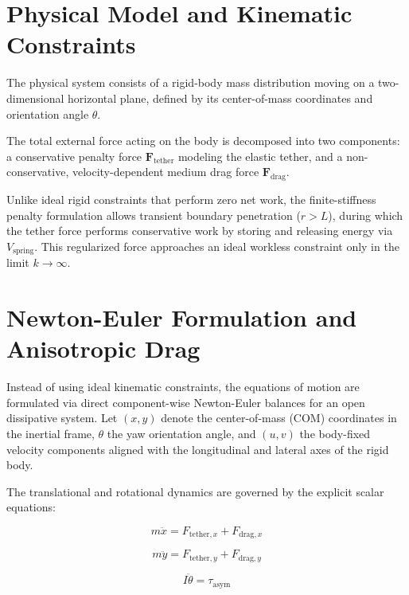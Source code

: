 \documentclass[11pt,aip,reprint,superscriptaddress]{revtex4-2}
\begin{document}
\section{Physical Model and Kinematic Constraints}

The physical system consists of a rigid-body mass distribution moving on a two-dimensional horizontal plane, defined by its center-of-mass coordinates and orientation angle \(\theta\).

The total external force acting on the body is decomposed into two components: a conservative penalty force \(\mathbf{F}_{\text{tether}}\) modeling the elastic tether, and a non-conservative, velocity-dependent medium drag force \(\mathbf{F}_{\text{drag}}\). 

Unlike ideal rigid constraints that perform zero net work, the finite-stiffness penalty formulation allows transient boundary penetration (\(r > L\)), during which the tether force performs conservative work by storing and releasing energy via \(V_{\text{spring}}\). This regularized force approaches an ideal workless constraint only in the limit \(k \to \infty\).

\section{Newton-Euler Formulation and Anisotropic Drag}

Instead of using ideal kinematic constraints, the equations of motion are formulated via direct component-wise Newton-Euler balances for an open dissipative system. Let \((x, y)\) denote the center-of-mass (COM) coordinates in the inertial frame, \(\theta\) the yaw orientation angle, and \((u, v)\) the body-fixed velocity components aligned with the longitudinal and lateral axes of the rigid body.

The translational and rotational dynamics are governed by the explicit scalar equations:

\begin{equation}
m \ddot{x} = F_{\text{tether}, x} + F_{\text{drag}, x}
\end{equation}

\begin{equation}
m \ddot{y} = F_{\text{tether}, y} + F_{\text{drag}, y}
\end{equation}

\begin{equation}
I \ddot{\theta} = \tau_{\text{asym}}
\end{equation}
\end{document}

